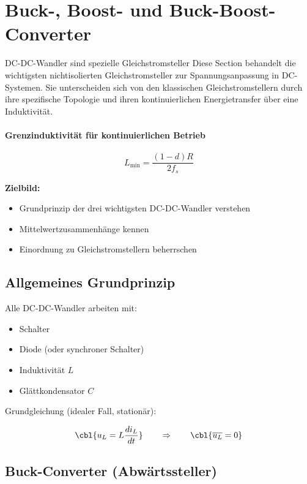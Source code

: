 \section{Buck-, Boost- und Buck-Boost-Converter}
DC-DC-Wandler sind spezielle Gleichstromsteller
Diese Section behandelt die wichtigsten nichtisolierten Gleichstromsteller zur
Spannungsanpassung in DC-Systemen.  
Sie unterscheiden sich von den klassischen Gleichstromstellern durch ihre
spezifische Topologie und ihren kontinuierlichen Energietransfer über eine Induktivität.

\smallskip
\paragraph{Grenzinduktivität für kontinuierlichen Betrieb}
\[
L_{\min} = \frac{(1-d)R}{2 f_s}
\]


\textbf{Zielbild:}
\begin{itemize}
    \item Grundprinzip der drei wichtigsten DC-DC-Wandler verstehen
    \item Mittelwertzusammenhänge kennen
    \item Einordnung zu Gleichstromstellern beherrschen
\end{itemize}

\subsection{Allgemeines Grundprinzip}

Alle DC-DC-Wandler arbeiten mit:

\begin{itemize}
    \item Schalter
    \item Diode (oder synchroner Schalter)
    \item Induktivität $L$
    \item Glättkondensator $C$
\end{itemize}

Grundgleichung (idealer Fall, stationär):

\[
\cbl{u_L = L \frac{di_L}{dt}}
\qquad
\Rightarrow
\qquad
\cbl{\overline{u_L} = 0}
\]


\subsection{Buck-Converter (Abwärtssteller)}

